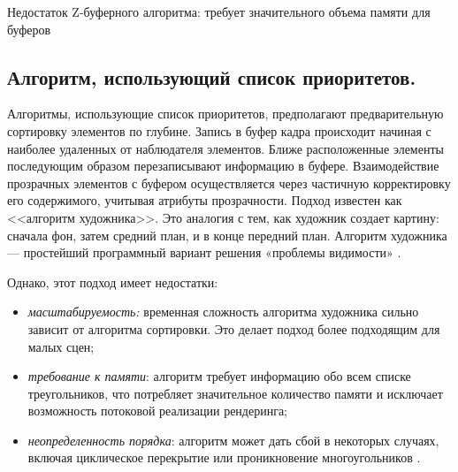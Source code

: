 Недостаток Z-буферного алгоритма: требует значительного объема памяти для буферов~\cite{del_line}




\subsection{Алгоритм, использующий список приоритетов.}

Алгоритмы, использующие список приоритетов, предполагают предварительную сортировку элементов по глубине. Запись в буфер кадра происходит начиная с наиболее удаленных от наблюдателя элементов. Ближе расположенные элементы последующим образом перезаписывают информацию в буфере. Взаимодействие прозрачных элементов с буфером осуществляется через частичную корректировку его содержимого, учитывая атрибуты прозрачности. Подход известен как <<алгоритм художника>>. Это аналогия с тем, как художник создает картину: сначала фон, затем средний план, и в конце передний план. Алгоритм художника --- простейший программный вариант решения «проблемы видимости» \cite{light, del_line}. 

Однако, этот подход имеет недостатки:
\begin{itemize}
	\item \textit{масштабируемость:} временная сложность алгоритма художника сильно зависит от алгоритма сортировки. Это делает подход более подходящим для малых сцен;
	\item \textit{требование к памяти}: алгоритм требует информацию обо всем списке треугольников, что потребляет значительное количество памяти и исключает возможность потоковой реализации рендеринга;
	\item \textit{неопределенность порядка}: алгоритм может дать сбой в некоторых случаях, включая циклическое перекрытие или проникновение многоугольников \cite{light}.
\end{itemize}

